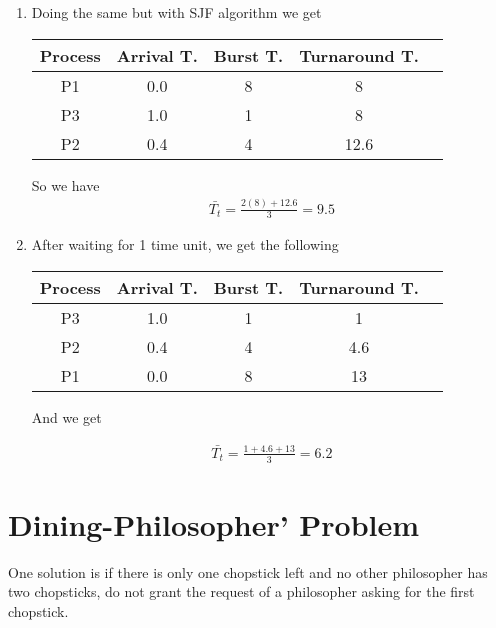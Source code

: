 \documentclass{article}
\begin{document}
\begin{enumerate}[label=(\alph*)]
	\item Doing the same but with SJF algorithm we get
	      \begin{center}
		      \begin{tabular}{|c|c|c|c|c|}
			      \hline
			      Process & Arrival T. & Burst T. & Turnaround T. \\
			      \hline
			      P1      & 0.0        & 8        & 8             \\
			      \hline
			      P3      & 1.0        & 1        & 8             \\
			      \hline
			      P2      & 0.4        & 4        & 12.6          \\
			      \hline
		      \end{tabular}
	      \end{center}
	      So we have
	      \begin{align*}
		      \bar{T_{t}} = \frac{2(8)+ 12.6}{3} = 9.5
	      \end{align*}
	\item After waiting for 1 time unit, we get the following
	      \begin{center}
		      \begin{tabular}{|c|c|c|c|c|}
			      \hline
			      Process & Arrival T. & Burst T. & Turnaround T. \\
			      \hline
			      P3      & 1.0        & 1        & 1             \\
			      \hline
			      P2      & 0.4        & 4        & 4.6           \\
			      \hline
			      P1      & 0.0        & 8        & 13            \\
			      \hline
		      \end{tabular}
	      \end{center}
	      And we get

	      \begin{align*}
		      \bar{T_{t}} = \frac{1 + 4.6 + 13}{3} = 6.2
	      \end{align*}
\end{enumerate}

\section{Dining-Philosopher' Problem}%
One solution is if there is only one chopstick left and no other philosopher has two chopsticks, do not grant the request of a philosopher asking for the first chopstick.
\end{document}
